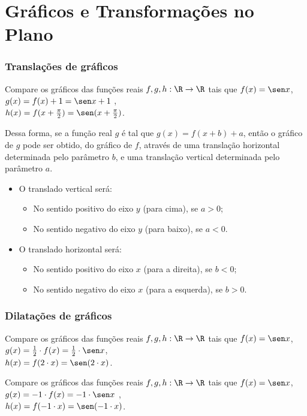 \section{Gráficos e Transformações no Plano}
\begin{frame}
\frametitle{Translações de gráficos} 

\begin{exemplo}
Compare os gráficos das funções reais $f, g , h: \R \to \R$ tais que
$f(x) = \sen x$, \\ $g(x) = f(x) + 1 = \sen x +1$ , \\ $h(x)=
f(x+\frac {\pi} 2)= \sen (x+ \frac {\pi} 2)$.
\end{exemplo}\pause

Dessa forma, se a função real $g$ é tal que $g(x) = f(x+b) +a$,
então o gráfico de $g$ pode ser obtido, do gráfico de $f$, através
de uma translação horizontal determinada pelo parâmetro $b$, e uma
translação vertical determinada pelo parâmetro $a$. \pause
\begin{itemize}
	\item O translado vertical será:
				\begin{itemize}
					\item No sentido positivo do eixo $y$ (para cima), se
					$a>0$;
					\item No sentido negativo do eixo $y$ (para baixo), se
					$a<0$.
				\end{itemize} \pause
	\item O translado horizontal será:
				\begin{itemize}
					\item No sentido positivo do eixo $x$ (para a direita), se $b<0$;
					\item No sentido negativo do eixo $x$ (para a esquerda), se $b>0$.
				\end{itemize}
\end{itemize}


\end{frame}


\begin{frame}
\frametitle{Dilatações de gráficos} 

\begin{exemplo}
Compare os gráficos das funções reais $f, g , h: \R \to \R$ tais que
$f(x) = \sen x$, \\ $g(x) = \frac 1 2 \cdot f(x)  = \frac 1 2 \cdot \sen x $, \\
$h(x)= f(2 \cdot x)= \sen (2 \cdot x)$.
\end{exemplo}\pause

\begin{exemplo}
Compare os gráficos das funções reais $f, g , h: \R \to \R$ tais que
$f(x) = \sen x$, \\ $g(x) = -1 \cdot f(x)  = -1 \cdot \sen x $ , \\
$h(x)= f(-1 \cdot x)= \sen (-1 \cdot x)$.
\end{exemplo}

\end{frame}

